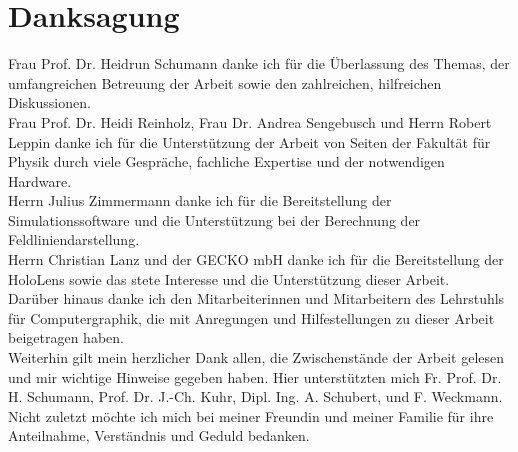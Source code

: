 \section*{Danksagung}
Frau Prof. Dr. Heidrun Schumann danke ich für die Überlassung des Themas, der umfangreichen Betreuung der Arbeit sowie den zahlreichen, hilfreichen Diskussionen.\\

Frau Prof. Dr. Heidi Reinholz, Frau Dr. Andrea Sengebusch und Herrn Robert Leppin danke ich für die Unterstützung der Arbeit von Seiten der Fakultät für Physik durch viele Gespräche, fachliche Expertise und der notwendigen Hardware.\\

Herrn Julius Zimmermann danke ich für die Bereitstellung der Simulationssoftware und die Unterstützung bei der Berechnung der Feldliniendarstellung.\\

Herrn Christian Lanz und der GECKO mbH danke ich für die Bereitstellung der HoloLens sowie das stete Interesse und die Unterstützung dieser Arbeit.\\

Darüber hinaus danke ich den Mitarbeiterinnen und Mitarbeitern des Lehrstuhls für Computergraphik, die mit Anregungen und Hilfestellungen zu dieser Arbeit beigetragen haben.\\

Weiterhin gilt mein herzlicher Dank allen, die Zwischenstände der Arbeit gelesen und mir wichtige Hinweise gegeben haben. Hier unterstützten mich Fr. Prof. Dr. H. Schumann, Prof. Dr. J.-Ch. Kuhr, Dipl. Ing. A. Schubert, und F. Weckmann.\\

Nicht zuletzt möchte ich mich bei meiner Freundin und meiner Familie für ihre Anteilnahme, Verständnis und Geduld bedanken.